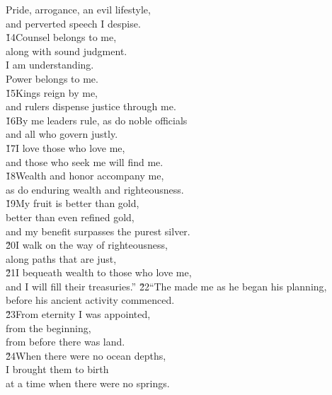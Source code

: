 \begin{poetry}
\poemll    Pride, arrogance, an evil lifestyle, \\
\poemlll       and perverted speech I despise. \\
\poeml \v{14}Counsel belongs to me, \\
\poemll    along with sound judgment. \\
\poeml I am understanding. \\
\poemll    Power belongs to me. \\
\poeml \v{15}Kings reign by me, \\
\poemll    and rulers dispense justice through me. \\
\poeml \v{16}By me leaders rule, as do noble officials \\
\poemll    and all who govern justly. \\
\poeml \v{17}I love those who love me, \\
\poemll    and those who seek me will find me. \\
\poeml \v{18}Wealth and honor accompany me, \\
\poemll    as do enduring wealth and righteousness. \\
\poeml \v{19}My fruit is better than gold, \\
\poemll    better than even refined gold, \\
\poemlll       and my benefit surpasses the purest silver. \\
\poeml \v{20}I walk on the way of righteousness, \\
\poemll    along paths that are just, \\
\poeml \v{21}I bequeath wealth to those who love me, \\
\poemll    and I will fill their treasuries.''
\poeml \v{22}``The  made me as he began his planning, \\
\poemll    before his ancient activity commenced. \\
\poeml \v{23}From eternity I was appointed, \\
\poemll    from the beginning, \\
\poemlll       from before there was land. \\
\poeml \v{24}When there were no ocean depths, \\
\poemll    I brought them to birth \\
\poemlll       at a time when there were no springs. \\

\end{poetry}
